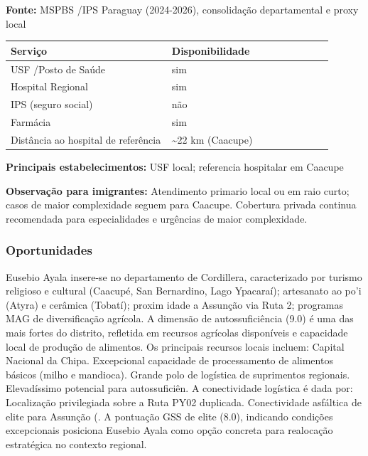 \textbf{Fonte:} MSPBS /\allowbreak  IPS Paraguay (2024-2026), consolidação
departamental e proxy local

{\def\LTcaptype{none} %
\begin{longtable}{@{}>{\raggedright\arraybackslash}p{0.45\linewidth} >{\raggedright\arraybackslash}p{0.45\linewidth}@{}}
\toprule\noalign{}
Serviço & Disponibilidade \\
\midrule\noalign{}
\endhead
\bottomrule\noalign{}
\endlastfoot
USF /\allowbreak  Posto de Saúde & sim \\
Hospital Regional & sim \\
IPS (seguro social) & não \\
Farmácia & sim \\
Distância ao hospital de referência & \textasciitilde22 km (Caacupe) \\
\end{longtable}
}

\textbf{Principais estabelecimentos:} USF local; referencia hospitalar
em Caacupe

\textbf{Observação para imigrantes:} Atendimento primario local ou em
raio curto; casos de maior complexidade seguem para Caacupe. Cobertura
privada continua recomendada para especialidades e urgências de maior
complexidade.
\newpage

\subsubsection*{Oportunidades}\label{oport-eusebio-ayala-0307}
Eusebio Ayala insere-se no departamento de Cordillera, caracterizado por turismo religioso e cultural (Caacupé, San Bernardino, Lago Ypacaraí); artesanato ao po'i (Atyra) e cerâmica (Tobatí); proxim idade a Assunção via Ruta 2; programas MAG de diversificação agrícola. A dimensão de autossuficiência (9.0) é uma das mais fortes do distrito, refletida em recursos agrícolas disponíveis e capacidade local de produção de alimentos. Os principais recursos locais incluem: Capital Nacional da Chipa. Excepcional capacidade de processamento de alimentos básicos (milho e mandioca). Grande polo de logística de suprimentos regionais. Elevadíssimo potencial para autossuficiên. A conectividade logística é dada por: Localização privilegiada sobre a Ruta PY02 duplicada. Conectividade asfáltica de elite para Assunção (. A pontuação GSS de elite (8.0), indicando condições excepcionais posiciona Eusebio Ayala como opção concreta para realocação estratégica no contexto regional.

